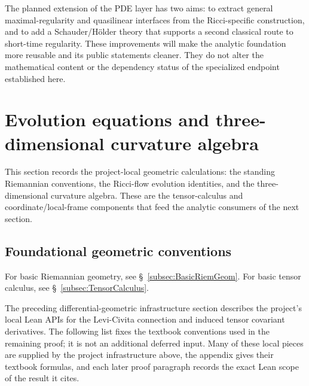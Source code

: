 \documentclass[11pt]{article}
\theoremstyle{plain}
\theoremstyle{definition}
\theoremstyle{remark}
\begin{document}
The planned extension of the PDE layer has two aims: to extract general
maximal-regularity and quasilinear interfaces from the Ricci-specific
construction, and to add a Schauder/H\"older theory that supports a second
classical route to short-time regularity.  These improvements will make the
analytic foundation more reusable and its public statements cleaner.  They do
not alter the mathematical content or the dependency status of the specialized
endpoint established here.


\section{Evolution equations and three-dimensional curvature algebra}
\label{sec:local-tensor-geometry}

This section records the project-local geometric calculations: the standing
Riemannian conventions, the Ricci-flow evolution identities, and the
three-dimensional curvature algebra.  These are the tensor-calculus and
coordinate/local-frame components that feed the analytic consumers of the
next section.

\subsection{Foundational geometric conventions}

For basic Riemannian geometry, see \S~\ref{subsec:BasicRiemGeom}.  For basic
tensor calculus, see \S~\ref{subsec:TensorCalculus}.

The preceding differential-geometric infrastructure section describes the
project's local Lean APIs for the Levi-Civita connection and induced tensor
covariant derivatives.  The following list fixes the textbook conventions used
in the remaining proof; it is not an additional deferred input.  Many of
these local pieces are supplied by the project infrastructure above, the
appendix gives their textbook formulas, and each later proof paragraph records
the exact Lean scope of the result it cites.
\end{document}
